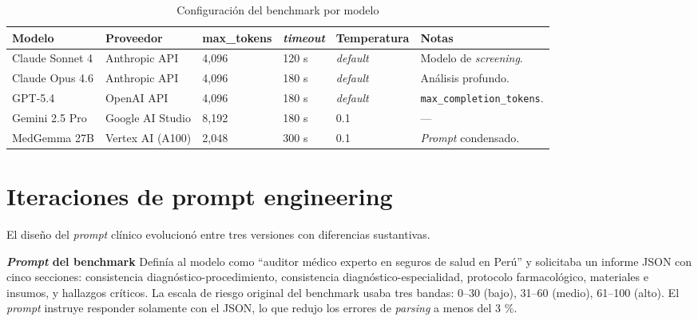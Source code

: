\begin{table}[H]
    \centering
    \caption{Configuración del benchmark por modelo}
    \label{tab:configuracion-benchmark-modelos}

    \footnotesize
    \setlength{\tabcolsep}{5pt}
    \renewcommand{\arraystretch}{1.2}

    \begin{tabular}{
        p{}
        p{}
        p{}
        p{}
        p{}
        p{}
    }
        \toprule
        \textbf{Modelo}
        & \textbf{Proveedor}
        & \textbf{max\_tokens}
        & \textbf{\textit{timeout}}
        & \textbf{Temperatura}
        & \textbf{Notas} \\
        \midrule

        Claude Sonnet 4
        & Anthropic API
        & 4,096
        & 120 s
        & \textit{default}
        & Modelo de \textit{screening}. \\

        Claude Opus 4.6
        & Anthropic API
        & 4,096
        & 180 s
        & \textit{default}
        & Análisis profundo. \\

        GPT-5.4
        & OpenAI API
        & 4,096
        & 180 s
        & \textit{default}
        & \texttt{max\_completion\_tokens}. \\

        Gemini 2.5 Pro
        & Google AI Studio
        & 8,192
        & 180 s
        & 0.1
        & --- \\

        MedGemma 27B
        & Vertex AI (A100)
        & 2,048
        & 300 s
        & 0.1
        & \textit{Prompt} condensado. \\

        \bottomrule
    \end{tabular}
\end{table}

\section{Iteraciones de prompt engineering}

El diseño del \textit{prompt} clínico evolucionó entre tres versiones con diferencias sustantivas.

\textbf{\textit{Prompt} del benchmark} Definía al modelo como “auditor médico experto en seguros de salud en Perú” y solicitaba un informe JSON con cinco secciones: consistencia diagnóstico-procedimiento, consistencia diagnóstico-especialidad, protocolo farmacológico, materiales e insumos, y hallazgos críticos. La escala de riesgo original del benchmark usaba tres bandas: 0–30 (bajo), 31–60 (medio), 61–100 (alto). El \textit{prompt} instruye responder solamente con el JSON, lo que redujo los errores de \textit{parsing} a menos del 3 \%.

